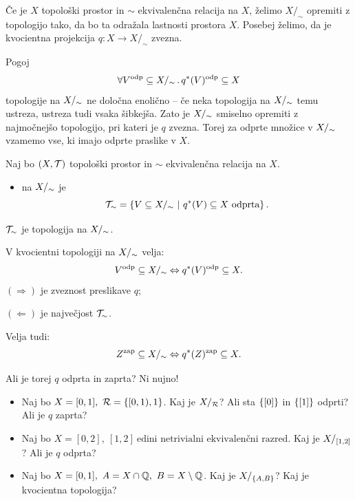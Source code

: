 Če je \(X\) topološki prostor in \(\sim\) ekvivalenčna relacija na \(X\), želimo \(X/_\sim\) opremiti z topologijo tako, da bo ta odražala lastnosti prostora \(X\). Posebej želimo, da je kvocientna projekcija \(q: X \to X/_\sim\) zvezna.

Pogoj \[\forall V^{\text{odp}} \subseteq {X/_\sim} \,.\, q^{*}(V)^{\text{odp}} \subseteq X\] topologije na \({X/_\sim}\) ne določna enolično -- če neka topologija na \({X/_\sim}\) temu ustreza, ustreza tudi vsaka šibkejša. Zato je \({X/_\sim}\) smiselno opremiti z najmočnejšo topologijo, pri kateri je \(q\) zvezna. Torej za odprte množice v \({X/_\sim}\) vzamemo vse, ki imajo odprte praslike v \(X\).

\begin{definicija}
    Naj bo \((X, \mathcal{T})\) topološki prostor in \(\sim\) ekvivalenčna relacija na \(X\).
    \begin{itemize}
        \item {} na \({X/_\sim}\) je \[\mathcal{T}_\sim = \left\{V \subseteq {X/_\sim} \ | \ q^{*}(V) \subseteq X \ \text{odprta}\right\}.\]
    \end{itemize}
\end{definicija}

\begin{trditev}
    \(\mathcal{T}_\sim\) je topologija na \({X/_\sim}\).
\end{trditev}

\begin{opomba}
    V kvocientni topologiji na \({X/_\sim}\) velja:
    \[V^{\text{odp}} \subseteq {X/_\sim} \Leftrightarrow q^{*}(V)^{\text{odp}} \subseteq X.\]
    \((\Rightarrow)\) je zveznost preslikave \(q\);

    \((\Leftarrow)\) je največjost \(\mathcal{T}_\sim\).

    Velja tudi: 
    \[Z^{\text{zap}} \subseteq {X/_\sim} \Leftrightarrow q^{*}(Z)^{\text{zap}} \subseteq X.\]
\end{opomba}

\begin{primer}
    Ali je torej \(q\) odprta in zaprta? Ni nujno!
    \begin{itemize}
        \item Naj bo \(X = [0,1], \ \mathcal{R} = \left\{[0, 1), {1}\right\}\). Kaj je \(X/_{\mathcal{R}}\)? Ali sta \(\left\{[0]\right\}\) in \(\left\{[1]\right\}\) odprti? Ali je \(q\) zaprta?
        \item Naj bo \(X = [0,2], \ [1, 2] \ \text{edini netrivialni ekvivalenčni razred}\). Kaj je \(X/_{[1, 2]}\)? Ali je \(q\) odprta?
        \item Naj bo \(X = [0, 1], \ A = X \cap \Q, \ B = X \setminus \Q\). Kaj je \(X/_{\left\{A, B\right\}}\)? Kaj je kvocientna topologija?
    \end{itemize}
\end{primer}

